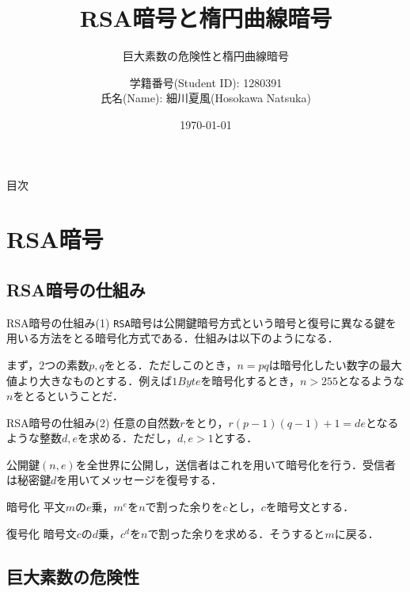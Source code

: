 \documentclass[11pt, aspectratio=169]{beamer}
\title{RSA暗号と楕円曲線暗号}
\subtitle{巨大素数の危険性と楕円曲線暗号}
\author{学籍番号(Student ID): 1280391 \\ 氏名(Name): 細川夏風(Hosokawa Natsuka)}
\institute{高知工科大学(Kochi Univ of Tech)}
\date{\today}
\begin{document}
\begin{frame}
    \titlepage
\end{frame}

\begin{frame}{目次}
    \tableofcontents
\end{frame}


\section{RSA暗号}
\subsection{RSA暗号の仕組み}

\begin{frame}{RSA暗号の仕組み(1)}
  \texttt{RSA}暗号は公開鍵暗号方式という暗号と復号に異なる鍵を用いる方法をとる暗号化方式である．仕組みは以下のようになる．

  \vspace{1em}

  まず，$2$つの素数$p, q$をとる．ただしこのとき，$n = pq$は暗号化したい数字の最大値より大きなものとする．例えば$1Byte$を暗号化するとき，$n > 255$となるような$n$をとるということだ．
\end{frame}

\begin{frame}{RSA暗号の仕組み(2)}
  任意の自然数$r$をとり，$r(p-1)(q-1) + 1 = de$となるような整数$d,e$を求める．ただし，$d, e > 1$とする．

  \vspace{1em}

  公開鍵$(n, e)$を全世界に公開し，送信者はこれを用いて暗号化を行う．受信者は秘密鍵$d$を用いてメッセージを復号する．

  \begin{block}{暗号化}
    平文$m$の$e$乗，$m^e$を$n$で割った余りを$c$とし，$c$を暗号文とする．
  \end{block}

  \begin{block}{復号化}
    暗号文$c$の$d$乗，$c^d$を$n$で割った余りを求める．そうすると$m$に戻る．
  \end{block}

\end{frame}

\subsection{巨大素数の危険性}
\end{document}
